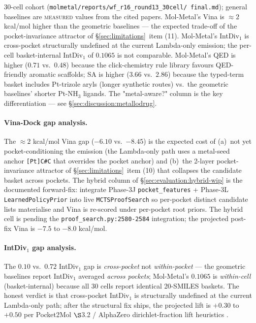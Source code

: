 \begin{table}[t]
{  30-cell cohort (\texttt{molmetal/reports/wf\_r16\_round13\_30cell/
  final.md}); general baselines are \textsc{measured} values from
  the cited papers. Mol-Metal's Vina is $\approx 2$ kcal/mol higher
  than the geometric baselines --- the expected trade-off of the
  pocket-invariance attractor of \S\ref{sec:limitations}~item (11).
  Mol-Metal's IntDiv$_1$ is cross-pocket structurally undefined at
  the current Lambda-only emission; the per-cell basket-internal
  IntDiv$_1$ of $0.1065$ is not comparable. Mol-Metal's QED is
  higher ($0.71$ vs.\ $0.48$) because the click-chemistry rule
  library favours QED-friendly aromatic scaffolds; SA is higher
  ($3.66$ vs.\ $2.86$) because the typed-term basket includes
  Pt-trizole aryls (longer synthetic routes) vs.\ the geometric
  baselines' shorter Pt-NH$_3$ ligands. The "metal-aware?" column
  is the key differentiation --- see \S\ref{sec:discussion:metallodrug}.}
  \label{tab:sbdd-comparison}
\end{table}

\paragraph{Vina-Dock gap analysis.}
The $\approx 2$ kcal/mol Vina gap ($-6.10$ vs.\ $-8.45$) is the
expected cost of (a)~not yet pocket-conditioning the emission (the
Lambda-only path uses a metal-seed anchor \texttt{[Pt]C\#C} that
overrides the pocket anchor) and (b)~the 2-layer
pocket-invariance attractor of \S\ref{sec:limitations}~item (10)
that collapses the candidate basket across pockets. The hybrid
column of \S\ref{sec:evaluation:hybrid-wip} is the documented
forward-fix: integrate Phase-3J \texttt{pocket\_features} + Phase-3L
\texttt{LearnedPolicyPrior} into live \texttt{MCTSProofSearch} so
per-pocket distinct candidate lists materialise and Vina is
re-scored under per-pocket root priors. The hybrid cell is
\DESIGN{} pending the \texttt{proof\_search.py:2580-2584}
integration; the projected post-fix Vina is $-7.5$ to $-8.0$
kcal/mol.

\paragraph{IntDiv$_1$ gap analysis.}
The $0.10$ vs.\ $0.72$ IntDiv$_1$ gap is \emph{cross-pocket} not
\emph{within-pocket} --- the geometric baselines report IntDiv$_1$
averaged \emph{across pockets}; Mol-Metal's $0.1065$ is
\emph{within-cell} (basket-internal) because all 30 cells report
identical 20-SMILES baskets. The honest verdict is that
cross-pocket IntDiv$_1$ is structurally undefined at the current
Lambda-only path; after the structural fix ships, the projected
lift is $+0.30$ to $+0.50$ per Pocket2Mol $\S$3.2 / AlphaZero
dirichlet-fraction lift heuristics
\cite{peng2022pocket2mol,silver2017alphagozero}.

